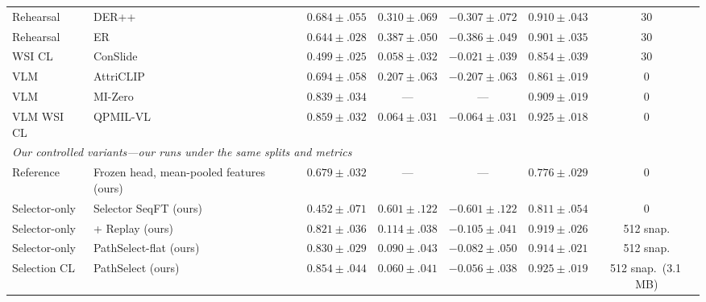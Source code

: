 \documentclass{article}
\begin{document}
\begin{table}[t]
\begin{tabular}{llccccc}
Rehearsal & DER++ \cite{buzzega2020derpp} & $0.684{\pm}.055$ & $0.310{\pm}.069$ & $-0.307{\pm}.072$ & $0.910{\pm}.043$ & 30 \\
Rehearsal & ER \cite{chaudhry2019er} & $0.644{\pm}.028$ & $0.387{\pm}.050$ & $-0.386{\pm}.049$ & $0.901{\pm}.035$ & 30 \\
WSI CL & ConSlide \cite{huang2023conslide} & $0.499{\pm}.025$ & $0.058{\pm}.032$ & $-0.021{\pm}.039$ & $0.854{\pm}.039$ & 30 \\
VLM & AttriCLIP \cite{wang2023attriclip} & $0.694{\pm}.058$ & $0.207{\pm}.063$ & $-0.207{\pm}.063$ & $0.861{\pm}.019$ & 0 \\
VLM & MI-Zero \cite{lu2023mizero} & $0.839{\pm}.034$ & --- & --- & $0.909{\pm}.019$ & 0 \\
VLM WSI CL & QPMIL-VL \cite{gou2025qpmil} & $0.859{\pm}.032$ & $0.064{\pm}.031$ & $-0.064{\pm}.031$ & $0.925{\pm}.018$ & 0 \\
\midrule
\multicolumn{7}{l}{\emph{Our controlled variants---our runs under the same splits and metrics}} \\
Reference & Frozen head, mean-pooled features (ours) & $0.679{\pm}.032$ & --- & --- & $0.776{\pm}.029$ & 0 \\
Selector-only & Selector SeqFT (ours) & $0.452{\pm}.071$ & $0.601{\pm}.122$ & $-0.601{\pm}.122$ & $0.811{\pm}.054$ & 0 \\
Selector-only & + Replay (ours) & $0.821{\pm}.036$ & $0.114{\pm}.038$ & $-0.105{\pm}.041$ & $0.919{\pm}.026$ & 512 snap. \\
Selector-only & PathSelect-flat (ours) & $0.830{\pm}.029$ & $0.090{\pm}.043$ & $-0.082{\pm}.050$ & $0.914{\pm}.021$ & 512 snap. \\
Selection CL & PathSelect (ours) & $0.854{\pm}.044$ & $0.060{\pm}.041$ & $-0.056{\pm}.038$ & $0.925{\pm}.019$ & 512 snap.\ (3.1\,MB) \\
\bottomrule
\end{tabular}
\end{table}
\end{document}
